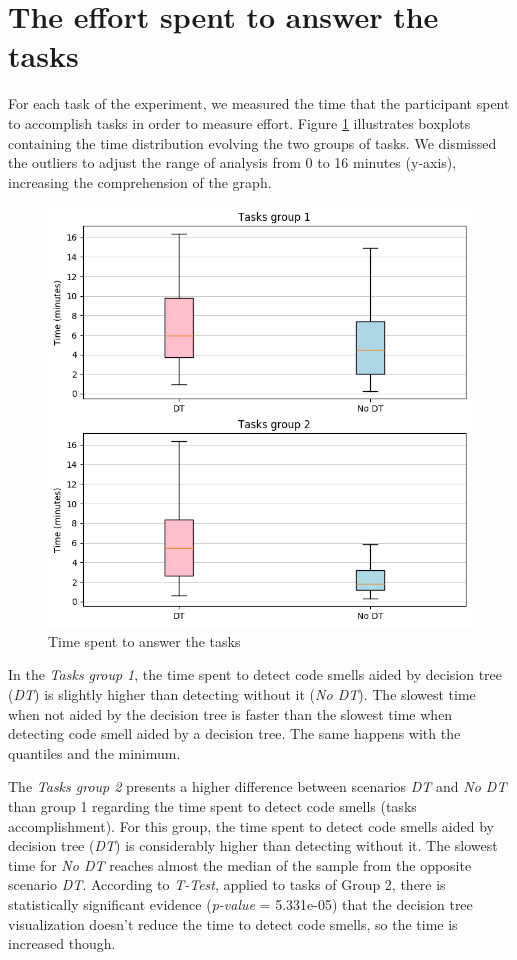 \section{The effort spent to answer the tasks} \label{sec:effortSpentAnswerTasks}

For each task of the experiment, we measured the time that the participant spent to accomplish tasks in order to measure effort. Figure \ref{fig:timeSpentAnswerTasks} illustrates boxplots containing the time distribution evolving the two groups of tasks. We dismissed the outliers to adjust the range of analysis from 0 to 16 minutes (y-axis), increasing the comprehension of the graph. 

\begin{figure}[ht]
\centering
\includegraphics[width=13cm]{figures/graph_boxplot_time_required.png}
\caption{Time spent to answer the tasks}
\label{fig:timeSpentAnswerTasks}
\end{figure}

In the \textit{Tasks group 1}, the time spent to detect code smells aided by decision tree (\textit{DT}) is slightly higher than detecting without it (\textit{No DT}). The slowest time when not aided by the decision tree is faster than the slowest time when detecting code smell aided by a decision tree. The same happens with the quantiles and the minimum.

The \textit{Tasks group 2} presents a higher difference between scenarios \textit{DT} and \textit{No DT} than group 1 regarding the time spent to detect code smells (tasks accomplishment). For this group, the time spent to detect code smells aided by decision tree (\textit{DT}) is considerably higher than detecting without it. The slowest time for \textit{No DT} reaches almost the median of the sample from the opposite scenario \textit{DT}. According to \textit{T-Test}, applied to tasks of Group 2, there is statistically significant evidence (\textit{p-value} = 5.331e-05) that the decision tree visualization doesn't reduce the time to detect code smells, so the time is increased though. 

